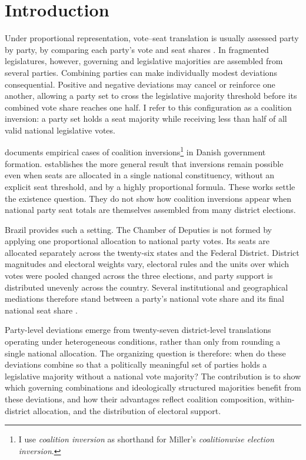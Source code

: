 \documentclass[11pt]{article}
\begin{document}
\section{Introduction}

Under proportional representation, vote--seat translation is usually assessed
party by party, by comparing each party's vote and seat shares \parencite{kaminski26_propor_repres_primer}. In
fragmented legislatures, however, governing and legislative majorities are
assembled from several parties. Combining parties can make individually modest
deviations consequential. Positive and negative deviations may cancel or
reinforce one another, allowing a party set to cross the legislative majority
threshold before its combined vote share reaches one half. I refer to this
configuration as a coalition inversion: a party set holds a seat majority while
receiving less than half of all valid national legislative votes.
 


\textcite{kurrild-klitgaard13_elect_inver_coalit_propor_repres} documents empirical cases of coalition inversions\footnote{ I use
  \emph{coalition inversion} as shorthand for Miller's \emph{coalitionwise
    election inversion}.} in Danish government formation. \textcite{miller14_elect_inver_under_propor_repres} establishes the
more general result that inversions remain possible even when seats are
allocated in a single national constituency, without an explicit seat threshold,
and by a highly proportional formula. These works settle the existence question.
They do not show how coalition inversions appear when national party seat totals
are themselves assembled from many district elections.

Brazil provides such a setting. The Chamber of Deputies is not formed by
applying one proportional allocation to national party votes. Its seats are
allocated separately across the twenty-six states and the Federal District.
District magnitudes and electoral weights vary, electoral rules and the units
over which votes were pooled changed across the three elections, and party
support is distributed unevenly across the country. Several institutional and
geographical mediations therefore stand between a party's national vote share
and its final national seat share \parencite{bochsler2026winners}.  


Party-level deviations emerge from twenty-seven district-level translations
operating under heterogeneous conditions, rather than only from rounding a
single national allocation. The organizing question is therefore: when do these
deviations combine so that a politically meaningful set of parties holds a
legislative majority without a national vote majority? The contribution is to
show which governing combinations and ideologically structured majorities
benefit from these deviations, and how their advantages reflect coalition
composition, within-district allocation, and the distribution of
electoral support.
\end{document}
